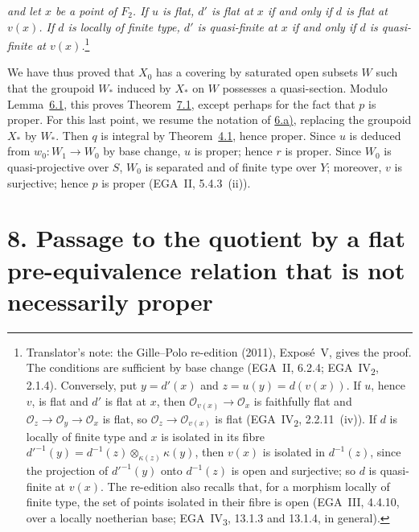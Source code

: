 
\emph{and let \(x\) be a point of \(F_2\).
If \(u\) is flat, \(d'\) is flat at \(x\) if and only if
\(d\) is flat at \(v(x)\). If \(d\) is locally of finite type, \(d'\) is
quasi-finite at \(x\) if and only if \(d\) is quasi-finite at \(v(x)\).}\footnote{Translator's note: the Gille--Polo re-edition (2011), Exposé~V, gives
the proof. The conditions are sufficient by base change (EGA~II, 6.2.4;
EGA~IV\textsubscript{2}, 2.1.4). Conversely, put \(y=d'(x)\) and \(z=u(y)=d(v(x))\).
If \(u\), hence \(v\), is flat and \(d'\) is flat at \(x\), then
\(\mathcal O_{v(x)}\to\mathcal O_x\) is faithfully flat and
\(\mathcal O_z\to\mathcal O_y\to\mathcal O_x\) is flat, so
\(\mathcal O_z\to\mathcal O_{v(x)}\) is flat (EGA~IV\textsubscript{2}, 2.2.11~(iv)). If \(d\) is
locally of finite type and \(x\) is isolated in its fibre
\(d'^{-1}(y)=d^{-1}(z)\otimes_{\kappa(z)}\kappa(y)\), then \(v(x)\) is isolated in
\(d^{-1}(z)\), since the projection of \(d'^{-1}(y)\) onto \(d^{-1}(z)\) is open and
surjective; so \(d\) is quasi-finite at \(v(x)\). The re-edition also recalls
that, for a morphism locally of finite type, the set of points isolated in
their fibre is open (EGA~III, 4.4.10, over a locally noetherian base;
EGA~IV\textsubscript{3}, 13.1.3 and 13.1.4, in general).}

We have thus proved that \(X_0\) has a covering by saturated open
subsets \(W\) such that the groupoid \(W_\ast\) induced by \(X_\ast\)
on \(W\) possesses a quasi-section. Modulo Lemma~\hyperref[lem:sga3-V-6.1]{6.1}, this proves
Theorem~\hyperref[thm:sga3-V-7.1]{7.1}, except perhaps for the fact that \(p\) is proper. For this
last point, we resume the notation of \hyperref[par:sga3-V-6-a]{6.a)}, replacing the groupoid
\(X_\ast\) by \(W_\ast\). Then \(q\) is integral by Theorem~\hyperref[thm:sga3-V-4.1]{4.1}, hence
proper. Since \(u\) is deduced from \(w_0:W_1\to W_0\) by base change, \(u\) is
proper; hence \(r\) is proper. Since \(W_0\) is quasi-projective over \(S\),
\(W_0\) is separated and of finite type over \(Y\); moreover, \(v\) is
surjective; hence \(p\) is proper (EGA~II, 5.4.3~(ii)).

\section*{8. Passage to the quotient by a flat pre-equivalence relation
  that is not necessarily proper}
\label{sec:sga3-V-8}

